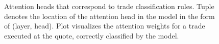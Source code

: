\begin{figure}[!ht]
    \caption[Rule-Like Roles of All Attention Heads]{Attention heads that correspond to trade classification rules. Tuple denotes the location of the attention head in the model in the form of (layer, head). Plot visualizes the attention weights for a trade executed at the quote, correctly classified by the model.}
    \label{fig:attention-heads-ise-all-transformer}
\end{figure}